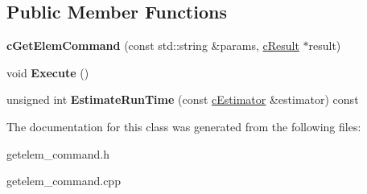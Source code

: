 \subsection*{\-Public \-Member \-Functions}
\begin{DoxyCompactItemize}
\item 
\hypertarget{classengine_1_1cGetElemCommand_ae65189d2ef82b1ca49295268846b1dd6}{
{\bfseries c\-Get\-Elem\-Command} (const std\-::string \&params, \hyperlink{classengine_1_1cResult}{c\-Result} $\ast$result)}
\label{classengine_1_1cGetElemCommand_ae65189d2ef82b1ca49295268846b1dd6}

\item 
\hypertarget{classengine_1_1cGetElemCommand_a16a627c20d55b3f2538bab7f63a04a04}{
void {\bfseries \-Execute} ()}
\label{classengine_1_1cGetElemCommand_a16a627c20d55b3f2538bab7f63a04a04}

\item 
\hypertarget{classengine_1_1cGetElemCommand_ad84c73fe5b4db65679f28c427d201434}{
unsigned int {\bfseries \-Estimate\-Run\-Time} (const \hyperlink{classengine_1_1cEstimator}{c\-Estimator} \&estimator) const }
\label{classengine_1_1cGetElemCommand_ad84c73fe5b4db65679f28c427d201434}

\end{DoxyCompactItemize}


\-The documentation for this class was generated from the following files\-:\begin{DoxyCompactItemize}
\item 
getelem\-\_\-command.\-h\item 
getelem\-\_\-command.\-cpp\end{DoxyCompactItemize}
